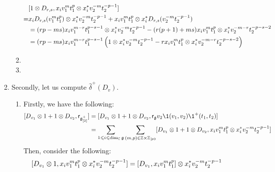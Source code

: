\begin{remark}
\begin{enumerate}
\begin{enumerate}
\begin{enumerate}
$$\begin{aligned}
                                        & [1 \tensor D_{r, s}, x_i v_1^m t_1^p \tensor x_i^* v_2^{-m} t_2^{-p - 1}]
                                        \\
                                        =  & x_i D_{r, s}(v_1^m t_1^p) \tensor x_i^* v_2^{-m} t_2^{-p - 1} + x_i v_1^m t_1^p \tensor x_i^* D_{r, s}(v_2^{-m} t_2^{-p - 1})
                                        \\
                                        & = (rp - ms) x_i v_1^{m - r} t_1^{p - s - 1} \tensor x_i^* v_2^{-m} t_2^{-p - 1} - (r(p + 1) + ms) x_i v_1^m t_1^p \tensor x_i^* v_2^{-m - r} t_2^{-p - s - 2}
                                        \\
                                        & = (rp - ms) x_i v_1^{m - r} t_1^{p - s - 1} \left( 1 \tensor x_i^* v_2^{-m} t_2^{-p - 1} - r x_i v_1^m t_1^p \tensor x_i^* v_2^{-m - r} t_2^{-p - s - 2} \right)
                                    \end{aligned}
                                $$
                            \item 
                            \item 
                        \end{enumerate}
                        \item Secondly, let us compute $\hat{\delta}^+(D_v)$. 
                        \begin{enumerate}
                            \item Firstly, we have the following:
                                $$
                                    \begin{aligned}
                                        [D_{v_1} \tensor 1 + 1 \tensor D_{v_2}, \sfr_{\g_{[2]}^+}] & = [D_{v_1} \tensor 1 + 1 \tensor D_{v_2}, \sfr_{\g} v_2 \1(v_1, v_2) \1^+(t_1, t_2)]
                                        \\
                                        & = \sum_{1 \leq i \leq \dim_{\bbC} \g} \sum_{(m, p) \in \Z \x \Z_{\geq 0}} [D_{v_1} \tensor 1 + 1 \tensor D_{v_2}, x_i v_1^m t_1^p \tensor x_i^* v_2^{-m} t_2^{-p - 1}]
                                    \end{aligned}
                                $$
                            Then, consider the following:
                                $$
                                    \begin{aligned}
                                        [D_{v_1} \tensor 1, x_i v_1^m t_1^p \tensor x_i^* v_2^{-m} t_2^{-p - 1}] & = [D_{v_1}, x_i v_1^m t_1^p] \tensor x_i^* v_2^{-m} t_2^{-p - 1}

\end{aligned}$$
\end{enumerate}
\end{enumerate}
\end{enumerate}
\end{remark}
